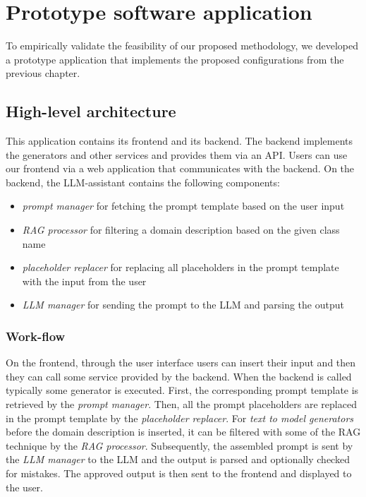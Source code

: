 \chapter{Prototype software application}
\label{chap:protype_software_application}

To empirically validate the feasibility of our proposed methodology, we developed a prototype application that implements the proposed configurations from the previous chapter.


\section{High-level architecture}

This application contains its frontend and its backend. The backend implements the generators and other services and provides them via an API. Users can use our frontend via a web application that communicates with the backend. On the backend, the LLM-assistant contains the following components:

\begin{itemize}
\item \emph{prompt manager} for fetching the prompt template based on the user input
\item \emph{RAG processor} for filtering a domain description based on the given class name
\item \emph{placeholder replacer} for replacing all placeholders in the prompt template with the input from the user
\item \emph{LLM manager} for sending the prompt to the LLM and parsing the output
\end{itemize}


\subsection{Work-flow}

On the frontend, through the user interface users can insert their input and then they can call some service provided by the backend. When the backend is called typically some generator is executed. First, the corresponding prompt template is retrieved by the \emph{prompt manager}. Then, all the prompt placeholders are replaced in the prompt template by the \emph{placeholder replacer}. For \emph{text to model generators} before the domain description is inserted, it can be filtered with some of the RAG technique by the \emph{RAG processor}. Subsequently, the assembled prompt is sent by the \emph{LLM manager} to the LLM and the output is parsed and optionally checked for mistakes. The approved output is then sent to the frontend and displayed to the user.


